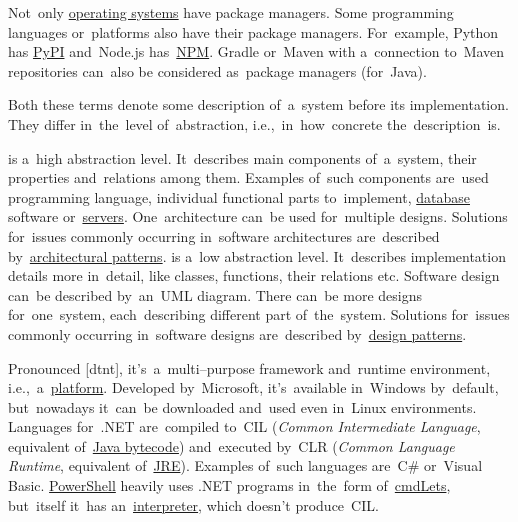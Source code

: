 Not~only \hyperref[os]{operating systems} have package managers.
Some programming languages or~platforms also have their package managers.
For~example, Python has \href{https://pypi.org/}{PyPI} and~Node.js has~\hyperref[npm]{NPM}.
Gradle or~Maven with a~connection to~Maven repositories can~also be considered as~package managers (for~Java).

\label{architecturedesign}
Both these terms denote some description of~a~system before its implementation.
They differ in~the~level of~abstraction, i.e.,~in~how~concrete the~description~is.
\begin{itemize}
     is a~high abstraction level.
            It~describes main components of~a~system, their properties and~relations among them.
            Examples of~such components are~used programming language, individual functional parts to~implement, \hyperref[databases]{database} software or~\hyperref[server]{servers}.
          One~architecture can~be used for~multiple designs.
          Solutions for~issues commonly occurring in~software architectures are~described by~\hyperref[architecturalpatterns]{architectural patterns}.
     is a~low abstraction level.
            It~describes implementation details more in~detail, like classes, functions, their relations etc.
            Software design can~be described by~an~UML diagram.
            There can~be more designs for~one~system, each~describing different part of~the~system.
            Solutions for~issues commonly occurring in~software designs are~described by~\hyperref[designpatterns]{design patterns}.
\end{itemize}

\label{dotnet}
Pronounced [d\textopeno{}tn\textepsilon{}t], it's~a~multi--purpose framework and~runtime environment, i.e.,~a~\hyperref[platform]{platform}.
Developed by~Microsoft, it's~available in~Windows by~default, but~nowadays it~can~be downloaded and~used even in~Linux environments.
Languages \mbox{for~.NET} are~compiled to~CIL (\textit{Common Intermediate Language}, equivalent of~\hyperref[javabytecode]{Java bytecode}) and~executed by~CLR (\textit{Common Language Runtime}, equivalent of~\hyperref[jdkjrejvm]{JRE}).
Examples of~such languages are~C\# or~Visual Basic.
\hyperref[powershell]{PowerShell} heavily uses .NET programs in~the~form of~\hyperref[cmdlet]{cmdLets}, but~itself it~has an~\hyperref[compiledinterpretedlanguages]{interpreter}, which doesn't produce~CIL\@.

